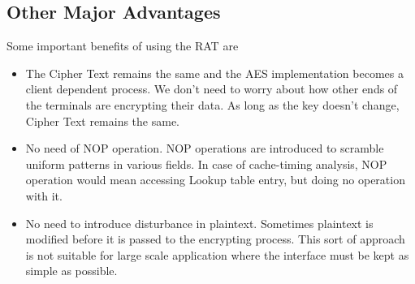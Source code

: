 \subsection{Other Major Advantages}
Some important benefits of using the RAT are
\begin{itemize}
\item The Cipher Text remains the same and the AES implementation becomes a client dependent process. We don't need to worry about how other ends of the terminals are encrypting their data. As long as the key doesn't change, Cipher Text remains the same. 
\item No need of NOP operation. NOP operations are introduced to scramble uniform patterns in various fields. In case of cache-timing analysis, NOP operation would mean accessing Lookup table entry, but doing no operation with it.
\item No need to introduce disturbance in plaintext. Sometimes plaintext is modified before it is passed to the encrypting process. This sort of approach is not suitable for large scale application where the interface must be kept as simple as possible.

\end{itemize}
